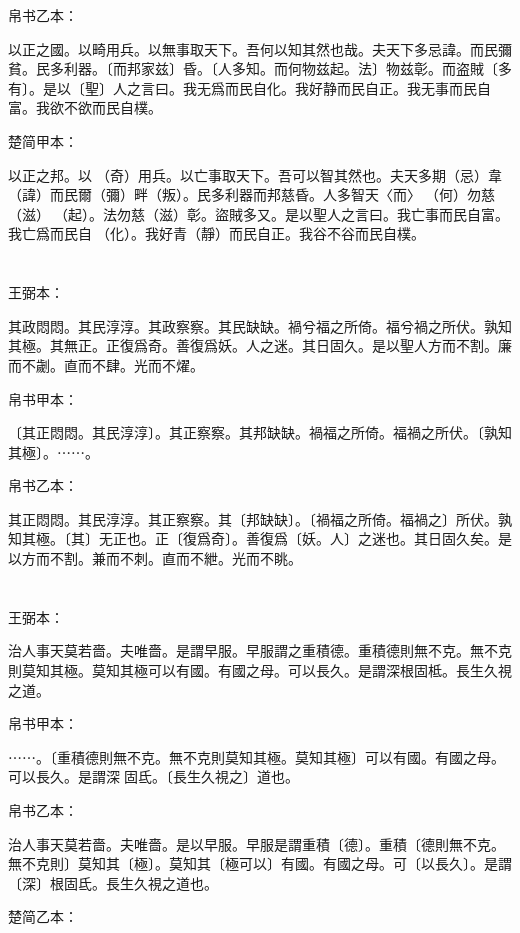 \documentclass[a5paper]{ctexbook}
\begin{document}
    帛书乙本：

    以正之國。以畸用兵。以無事取天下。吾何以知其然也哉。夫天下多忌諱。而民彌貧。民多利器。〔而邦家兹〕昏。〔人多知。而何物兹起。法〕物兹彰。而盗賊〔多有〕。是以〔聖〕人之言曰。我无爲而民自化。我好静而民自正。我无事而民自富。我欲不欲而民自樸。

    楚简甲本：

    以正之邦。以󶵊（奇）用兵。以亡事取天下。吾可以智其然也。夫天多期（忌）韋（諱）而民爾（彌）畔（叛）。民多利器而邦慈昏。人多智天〈而〉𢦪（何）勿慈（滋）󶵋（起）。法勿慈（滋）彰。盜賊多又。是以聖人之言曰。我亡事而民自富。我亡爲而民自󶵍（化）。我好青（靜）而民自正。我谷不谷而民自樸。

    \chapter{}
    王弼本：

    其政悶悶。其民淳淳。其政察察。其民缺缺。禍兮福之所倚。福兮禍之所伏。孰知其極。其無正。正復爲奇。善復爲妖。人之迷。其日固久。是以聖人方而不割。廉而不劌。直而不肆。光而不燿。

    
    帛书甲本：

    〔其正悶悶。其民淳淳〕。其正察察。其邦缺缺。禍福之所倚。福禍之所伏。〔孰知其極〕。⋯⋯。

    帛书乙本：

    其正悶悶。其民淳淳。其正察察。其〔邦缺缺〕。〔禍福之所倚。福禍之〕所伏。孰知其極。〔其〕无正也。正〔復爲奇〕。善復爲〔妖。人〕之迷也。其日固久矣。是以方而不割。兼而不刺。直而不紲。光而不眺。

    \chapter{}
    王弼本：

    治人事天莫若嗇。夫唯嗇。是謂早服。早服謂之重積德。重積德則無不克。無不克則莫知其極。莫知其極可以有國。有國之母。可以長久。是謂深根固柢。長生久視之道。

    
    帛书甲本：

    ⋯⋯。〔重積德則無不克。無不克則莫知其極。莫知其極〕可以有國。有國之母。可以長久。是謂深󱁆固氐。〔長生久視之〕道也。

    帛书乙本：

    治人事天莫若嗇。夫唯嗇。是以早服。早服是謂重積〔德〕。重積〔德則無不克。無不克則〕莫知其〔極〕。莫知其〔極可以〕有國。有國之母。可〔以長久〕。是謂〔深〕根固氐。長生久視之道也。

    楚简乙本：
\end{document}

